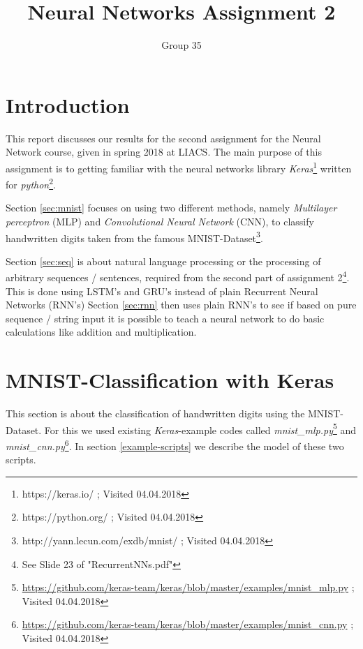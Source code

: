 \documentclass{article}[]
\begin{document}
\title{Neural Networks Assignment 2}
\author{Group 35}
\maketitle
\lstset{
  basicstyle=\ttfamily,
  keywordstyle=\bfseries,
  language=Java,
  frame=single,
  aboveskip=11pt,
  belowskip=11pt,
  breaklines=true,
  breakatwhitespace=false,
  showspaces=false,
  showstringspaces=false,
  numbers=left,
  stepnumber=1,    
  firstnumber=1,
  numberfirstline=true
}

\section{Introduction}
This report discusses our results for the second assignment for the Neural Network
course, given in spring 2018 at LIACS.
The main purpose of this assignment is to getting familiar with the neural networks library \textit{Keras}\footnote{https://keras.io/ ; Visited 04.04.2018} written for \textit{python}\footnote{https://python.org/ ; Visited 04.04.2018}.

Section \ref{sec:mnist} focuses on using two different methods, namely \emph{Multilayer perceptron} (MLP) and \emph{Convolutional Neural Network} (CNN), to classify handwritten digits taken from the famous MNIST-Dataset\footnote{http://yann.lecun.com/exdb/mnist/ ; Visited 04.04.2018}.

Section \ref{sec:seq} is about natural language processing or the processing of arbitrary sequences / sentences,  required from the second part of assignment 2\footnote{See Slide 23 of "RecurrentNNs.pdf"}. This is done using LSTM's and GRU's instead of plain Recurrent Neural Networks (RNN's)
Section \ref{sec:rnn} then uses plain RNN's to see if based on pure sequence / string input it is possible to teach a neural network to do basic calculations like addition and multiplication.

\section{MNIST-Classification with Keras}
\label{task-1}
\label{sec:mnist}
This section is about the classification of handwritten digits using the MNIST-Dataset.
For this we used existing \textit{Keras}-example codes called \textit{mnist\_mlp.py}\footnote{\url{https://github.com/keras-team/keras/blob/master/examples/mnist_mlp.py} ; Visited 04.04.2018} and \textit{mnist\_cnn.py}\footnote{\url{https://github.com/keras-team/keras/blob/master/examples/mnist_cnn.py} ; Visited 04.04.2018}.
In section \ref{example-scripts} we describe the model of these two scripts.
\end{document}
